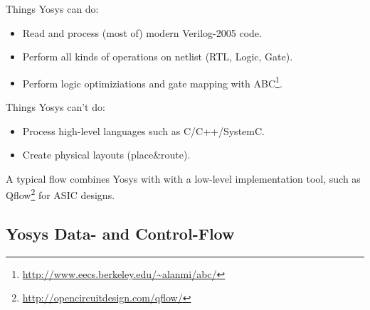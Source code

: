 \begin{frame}{\subsecname}

Things Yosys can do:
\begin{itemize}
\item Read and process (most of) modern Verilog-2005 code.
\item Perform all kinds of operations on netlist (RTL, Logic, Gate).
\item Perform logic optimiziations and gate mapping with ABC\footnote{\url{http://www.eecs.berkeley.edu/~alanmi/abc/}}.
\end{itemize}

\bigskip
Things Yosys can't do:
\begin{itemize}
\item Process high-level languages such as C/C++/SystemC.
\item Create physical layouts (place\&route).
\end{itemize}

\bigskip
A typical flow combines Yosys with with a low-level implementation tool, such
as Qflow\footnote{\url{http://opencircuitdesign.com/qflow/}} for ASIC designs.

\end{frame}


\subsection{Yosys Data- and Control-Flow}

